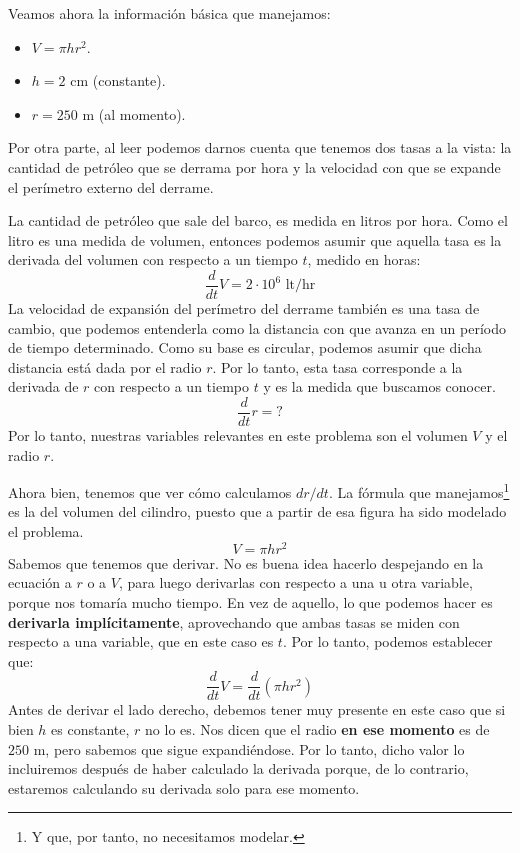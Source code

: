 \documentclass[12pt]{article}
\begin{document}
Veamos ahora la información básica que manejamos:

\begin{itemize}
\item $V = \pi h r^{2}$.
\item $h = 2$ cm (constante).
\item $r = 250$ m (al momento).
\end{itemize}

Por otra parte, al leer podemos darnos cuenta que tenemos dos tasas a la vista: la cantidad de petróleo que se derrama por hora y la velocidad con que se expande el perímetro externo del derrame.

La cantidad de petróleo que sale del barco, es medida en litros por hora. Como el litro es una medida de volumen, entonces podemos asumir que aquella tasa es la derivada del volumen con respecto a un tiempo $t$, medido en horas:
\[
	\frac{d}{dt}V = 2 \cdot 10^{6} \text{ lt/hr}
\]
La velocidad de expansión del perímetro del derrame también es una tasa de cambio, que podemos entenderla como la distancia con que avanza en un período de tiempo determinado. Como su base es circular, podemos asumir que dicha distancia está dada por el radio $r$. Por lo tanto, esta tasa corresponde a la derivada de $r$ con respecto a un tiempo $t$ y es la medida que buscamos conocer.
\[
	\frac{d}{dt}r = \text{?}
\]
Por lo tanto, nuestras variables relevantes en este problema son el volumen $V$ y el radio $r$.

Ahora bien, tenemos que ver cómo calculamos $dr/dt$. La fórmula que manejamos\footnote{Y que, por tanto, no necesitamos modelar.} es la del volumen del cilindro, puesto que a partir de esa figura ha sido modelado el problema.
\[
	V = \pi h r^{2}
\]
Sabemos que tenemos que derivar. No es buena idea hacerlo despejando en la ecuación a $r$ o a $V$, para luego derivarlas con respecto a una u otra variable, porque nos tomaría mucho tiempo. En vez de aquello, lo que podemos hacer es \textbf{derivarla implícitamente}, aprovechando que ambas tasas se miden con respecto a una variable, que en este caso es $t$. Por lo tanto, podemos establecer que:
\[
	\frac{d}{dt}V = \frac{d}{dt}(\pi h r^{2})
\]
Antes de derivar el lado derecho, debemos tener muy presente en este caso que si bien $h$ es constante, $r$ no lo es. Nos dicen que el radio \textbf{en ese momento} es de $250$ m, pero sabemos que sigue expandiéndose. Por lo tanto, dicho valor lo incluiremos después de haber calculado la derivada porque, de lo contrario, estaremos calculando su derivada solo para ese momento.
\end{document}
